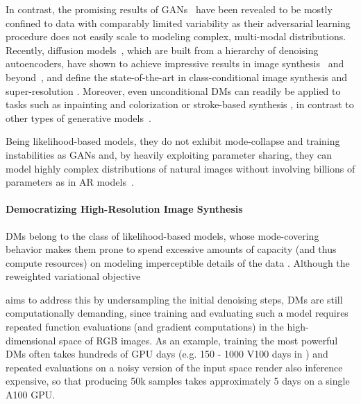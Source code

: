 In contrast, the promising results of GANs~\cite{goodfellow2014GAN, bigganbrock, karras2019stylebased} have been revealed to be mostly confined to data with comparably limited variability as their adversarial learning procedure does not easily scale to modeling complex, multi-modal distributions. Recently, diffusion models~\cite{DBLP:journals/corr/Sohl-DicksteinW15}, which are built from a hierarchy of denoising autoencoders, have shown to achieve impressive results in image synthesis~\cite{DBLP:conf/nips/HoJA20, DBLP:journals/corr/abs-2011-13456} and beyond~\cite{DBLP:journals/corr/abs-2107-00630, DBLP:conf/iclr/ChenZZWNC21, DBLP:conf/iclr/KongPHZC21, DBLP:journals/corr/abs-2103-16091}, and define the state-of-the-art in class-conditional image synthesis \cite{DBLP:journals/corr/abs-2105-05233, DBLP:journals/corr/abs-2106-15282} and super-resolution \cite{DBLP:journals/corr/abs-2104-07636}. Moreover, even unconditional DMs can readily be applied to tasks such as inpainting and colorization \cite{DBLP:journals/corr/abs-2011-13456} or stroke-based synthesis \cite{DBLP:journals/corr/abs-2108-01073}, in contrast to other types of generative models~\cite{VAE,VAE2,DBLP:conf/iclr/DinhSB17}.

Being likelihood-based models, they do not exhibit mode-collapse and training instabilities as GANs and, by heavily exploiting parameter sharing, they can model highly complex distributions of natural images without involving billions of parameters as in AR models~\cite{DBLP:conf/nips/RazaviOV19}. 

\paragraph{Democratizing High-Resolution Image Synthesis}
\enlargethispage{\baselineskip}

DMs belong to the class of likelihood-based models, whose mode-covering behavior makes them prone to spend excessive amounts of capacity (and thus compute resources) on modeling imperceptible details of the data \cite{dieleman2020typicality, DBLP:journals/corr/SalimansKCK17}. Although the reweighted variational objective \cite{DBLP:conf/nips/HoJA20} 

aims to address this by undersampling the initial denoising steps, DMs are still computationally demanding, since training and evaluating such a model requires repeated function evaluations (and gradient computations) in the high-dimensional space of RGB images. As an example, training the most powerful DMs often takes hundreds of GPU days (e.g. 150 - 1000 V100 days in \cite{DBLP:journals/corr/abs-2105-05233}) and repeated evaluations on a noisy version of the input space render also inference expensive, so that producing 50k samples takes approximately 5 days \cite{DBLP:journals/corr/abs-2105-05233} on a single A100 GPU. 

